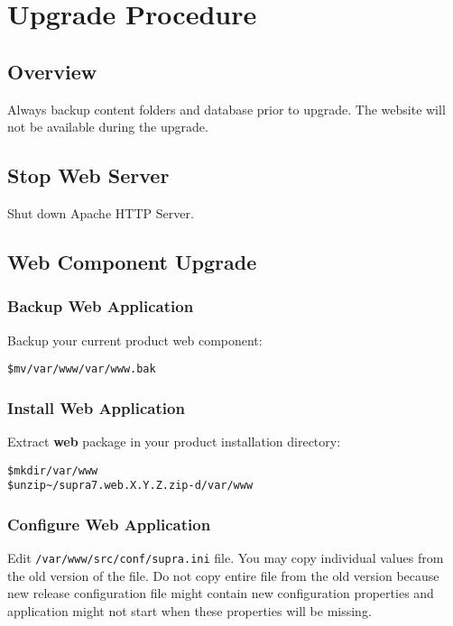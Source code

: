 \documentclass[12pt]{article}
\newcommand{\vigPackageName}{supra7}
\newcommand{\vigPathToProject}{/var/www}
\newcommand{\vigPathToSrc}{/src}
\newcommand{\vigReleasePath}{\textasciitilde/}
\newcommand{\vigReleaseVersion}{X.Y.Z}
\begin{document}
\section{Upgrade Procedure}

\subsection{Overview}
Always backup content folders and database prior to upgrade. The website will not be available during the upgrade.

\subsection{Stop Web Server}
Shut down Apache HTTP Server.

\subsection{Web Component Upgrade}

\subsubsection{Backup Web Application}
Backup your current product web component:

\begin{alltt}
\$ mv \vigPathToProject \vigPathToProject.bak
\end{alltt}

\subsubsection{Install Web Application}
Extract \textbf{web} package in your product installation directory:

\begin{alltt}
\$ mkdir \vigPathToProject
\$ unzip {\vigReleasePath}{\vigPackageName}.web.\vigReleaseVersion.zip -d \vigPathToProject
\end{alltt}

\subsubsection{Configure Web Application}
Edit \texttt{\vigPathToProject\vigPathToSrc/conf/supra.ini} file. You may copy individual values from the old version of the file. Do not copy entire file from the old version because new release configuration file might contain new configuration properties and application might not start when these properties will be missing.
\end{document}

